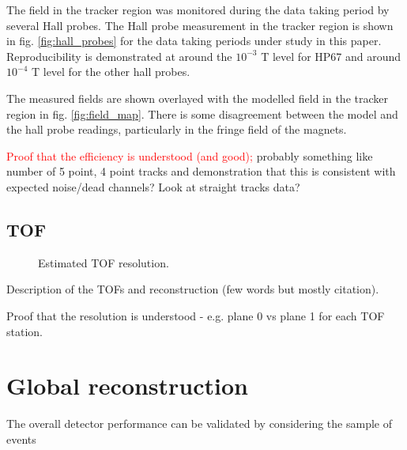 The field in the tracker region was monitored during the data taking period by
several Hall probes. The Hall probe measurement in the tracker region is shown
in fig. \ref{fig:hall_probes} for the data taking
periods under study in this paper. Reproducibility is demonstrated at around the
$10^{-3}$ T level for HP67 and around $10^{-4}$ T level for the other hall probes.

The measured fields are shown overlayed with the modelled field in the tracker 
region in fig. \ref{fig:field_map}. There is some disagreement between the model
and the hall probe readings, particularly in the fringe field of the magnets.

\textcolor{red}{Proof that the efficiency is understood (and good);} probably something like 
number of 5 point, 4 point tracks and demonstration that this is consistent with
expected noise/dead channels? Look at straight tracks data?

\subsection{TOF}

\begin{figure}[!tbh]
    \centering
    \caption{Estimated TOF resolution.}
\label{fig:tof_resolution}
\end{figure}

Description of the TOFs and reconstruction (few words but mostly citation).

Proof that the resolution is understood - e.g. plane 0 vs plane 1 for each TOF station.

\section{Global reconstruction}

The overall detector performance can be validated by considering the sample of events


